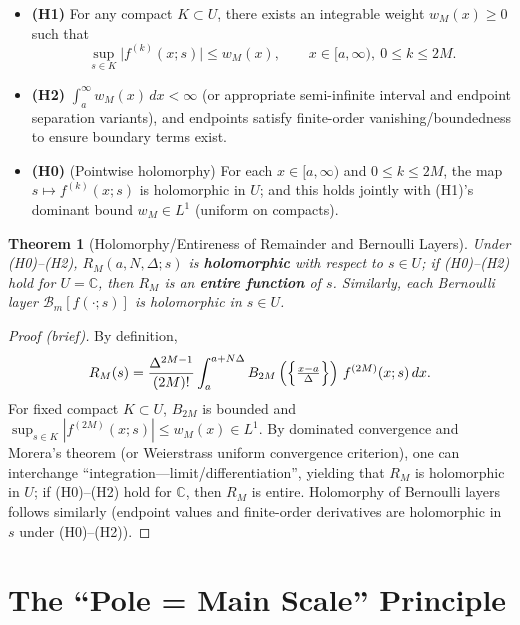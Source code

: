 \documentclass[11pt,a4paper]{article}
\newtheorem{theorem}{Theorem}[section]
\theoremstyle{remark}
\begin{document}
\begin{itemize}
\item \textbf{(H1)} For any compact $K\subset U$, there exists an integrable weight $w_M(x)\ge 0$ such that
\begin{equation}
\sup_{s\in K}\bigl|f^{(k)}(x;s)\bigr|\le w_M(x),\qquad x\in[a,\infty),\ 0\le k\le 2M.
\end{equation}

\item \textbf{(H2)} $\displaystyle \int_{a}^{\infty} w_M(x)\,dx<\infty$ (or appropriate semi-infinite interval and endpoint separation variants), and endpoints satisfy finite-order vanishing/boundedness to ensure boundary terms exist.

\item \textbf{(H0)} (Pointwise holomorphy) For each $x\in[a,\infty)$ and $0\le k\le 2M$, the map $s\mapsto f^{(k)}(x;s)$ is holomorphic in $U$; and this holds jointly with (H1)'s dominant bound $w_M\in L^1$ (uniform on compacts).
\end{itemize}

\begin{theorem}[Holomorphy/Entireness of Remainder and Bernoulli Layers]\label{thm:remainder}
Under (H0)--(H2), $R_M(a,N,\Delta;s)$ is \textbf{holomorphic} with respect to $s\in U$; if (H0)--(H2) hold for $U=\mathbb{C}$, then $R_M$ is an \textbf{entire function} of $s$. Similarly, each Bernoulli layer $\mathcal{B}_m[f(\cdot;s)]$ is holomorphic in $s\in U$.
\end{theorem}

\begin{proof}[Proof (brief)]
By definition,
\begin{equation}
R_M(s)=\frac{\Delta^{2M-1}}{(2M)!}\int_{a}^{a+N\Delta} B_{2M}\left(\Bigl\{\tfrac{x-a}{\Delta}\Bigr\}\right)\, f^{(2M)}(x;s)\,dx.
\end{equation}
For fixed compact $K\subset U$, $B_{2M}$ is bounded and $\sup_{s\in K}|f^{(2M)}(x;s)|\le w_M(x)\in L^1$. By dominated convergence and Morera's theorem (or Weierstrass uniform convergence criterion), one can interchange ``integration---limit/differentiation'', yielding that $R_M$ is holomorphic in $U$; if (H0)--(H2) hold for $\mathbb{C}$, then $R_M$ is entire. Holomorphy of Bernoulli layers follows similarly (endpoint values and finite-order derivatives are holomorphic in $s$ under (H0)--(H2)).
\end{proof}

\section{The ``Pole = Main Scale'' Principle}
\end{document}
